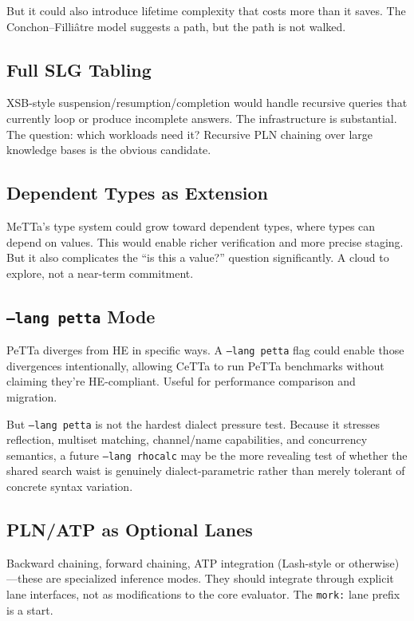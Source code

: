 \documentclass[11pt]{article}
\newcommand{\code}[1]{\texttt{#1}}
\newcommand{\PeTTa}{\textup{PeTTa}}
\newcommand{\HE}{\textup{HE}}
\newcommand{\CeTTa}{\textup{CeTTa}}
\newcommand{\XSB}{\textup{XSB}}
\begin{document}
But it could also introduce lifetime complexity that costs more than
it saves.  The Conchon--Filliâtre model suggests a path, but the path
is not walked.

\subsection{Full SLG Tabling}

\XSB{}-style suspension/resumption/completion would handle recursive
queries that currently loop or produce incomplete answers.  The
infrastructure is substantial.  The question: which workloads need it?
Recursive PLN chaining over large knowledge bases is the obvious
candidate.

\subsection{Dependent Types as Extension}

MeTTa's type system could grow toward dependent types, where types
can depend on values.  This would enable richer verification and
more precise staging.  But it also complicates the ``is this a value?''
question significantly.  A cloud to explore, not a near-term commitment.

\subsection{\code{--lang petta} Mode}

\PeTTa{} diverges from \HE{} in specific ways.  A \code{--lang petta}
flag could enable those divergences intentionally, allowing \CeTTa{}
to run \PeTTa{} benchmarks without claiming they're \HE{}-compliant.
Useful for performance comparison and migration.

But \code{--lang petta} is not the hardest dialect pressure test.
Because it stresses reflection, multiset matching, channel/name
capabilities, and concurrency semantics, a future \code{--lang
rhocalc} may be the more revealing test of whether the shared search
waist is genuinely dialect-parametric rather than merely tolerant of
concrete syntax variation.

\subsection{PLN/ATP as Optional Lanes}

Backward chaining, forward chaining, ATP integration (Lash-style or
otherwise)---these are specialized inference modes.  They should
integrate through explicit lane interfaces, not as modifications to
the core evaluator.  The \code{mork:} lane prefix is a start.
\end{document}
